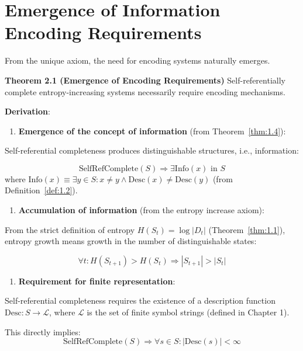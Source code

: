 
\section{Emergence of Information Encoding Requirements}
\label{sec:ch02_encoding:emergence-of-information-encoding-requirements}

From the unique axiom, the need for encoding systems naturally emerges.

\textbf{Theorem 2.1 (Emergence of Encoding Requirements)}
\label{thm:2.1}
Self-referentially complete entropy-increasing systems necessarily require encoding mechanisms.

\textbf{Derivation}:

\begin{enumerate}
\item \textbf{Emergence of the concept of information} (from Theorem~\ref{thm:1.4}):
\end{enumerate}
   Self-referential completeness produces distinguishable structures, i.e., information:
   
\begin{equation}
\text{SelfRefComplete}(S) \Rightarrow \exists \text{Info}(x) \text{ in } S
\end{equation}
   where $\text{Info}(x) \equiv \exists y \in S: x \neq y \land \text{Desc}(x) \neq \text{Desc}(y)$ (from Definition~\ref{def:1.2}).

\begin{enumerate}
\item \textbf{Accumulation of information} (from the entropy increase axiom):
\end{enumerate}
   From the strict definition of entropy $H(S_t) = \log |D_t|$ (Theorem~\ref{thm:1.1}),
   entropy growth means growth in the number of distinguishable states:
   
\begin{equation}
\forall t: H(S_{t+1}) > H(S_t) \Rightarrow |S_{t+1}| > |S_t|
\end{equation}

\begin{enumerate}
\item \textbf{Requirement for finite representation}:
\end{enumerate}
   Self-referential completeness requires the existence of a description function $\text{Desc}: S \to \mathcal{L}$,
   where $\mathcal{L}$ is the set of finite symbol strings (defined in Chapter 1).
   
   This directly implies:
\begin{equation}
\text{SelfRefComplete}(S) \Rightarrow \forall s \in S: |\text{Desc}(s)| < \infty
\end{equation}
   
